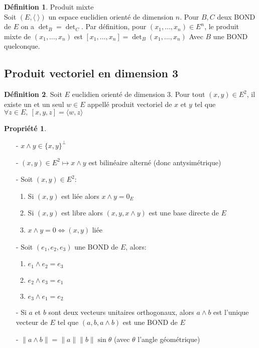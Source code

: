\documentclass[fleqn]{article}
\theoremstyle{definition} \newtheorem*{defi}{D\'efinition}
\theoremstyle{definition} \newtheorem*{theo}{Th\'eor\`eme}
\theoremstyle{definition} \newtheorem*{coro}{Corollaire}
\theoremstyle{remark} \newtheorem*{rqs}{Remarques}
\theoremstyle{definition} \newtheorem*{prop}{Propri\'et\'e}
\begin{document}
\begin{defi} Produit mixte \\
	Soit $(E, \langle\   \rangle)$ un espace euclidien orient\'e de dimension $n$. Pour $B,C$ deux BOND de $E$ on a $\det_B = \det_C$.
	Par d\'efinition, pour $(x_1, \hdots, x_n) \in E^n$, le produit mixte de $(x_1, \hdots, x_n)$ est $[x_1, \hdots, x_n] =
	\det_B (x_1, \hdots, x_n)$ Avec $B$ une BOND quelconque.
\end{defi}

\subsection{Produit vectoriel en dimension 3}

\begin{defi}
	Soit $E$ euclidien orient\'e de dimension 3. Pour tout $(x,y) \in E^2$, il existe un et un seul $w \in E$ appell\'e produit vectoriel de
	$x$ et $y$ tel que $\forall z \in E,\ [x,y,z] = \langle w,z \rangle$
\end{defi}

\begin{prop} $ $
	\begin{enumerate}
		\item [-] $x \wedge y \in \{x,y\}^\perp$
		\item [-] $(x,y) \in E^2 \mapsto x \wedge y$ est bilin\'eaire altern\'e (donc antysim\'etrique)
		\item [-] Soit $(x,y) \in E^2$:
			\begin{enumerate}
				\item Si $(x,y)$ est li\'ee alors $x \wedge y = 0_E$
				\item Si $(x,y)$ est libre alors $(x,y,x \wedge y)$ est une base directe de $E$
				\item $x \wedge y = 0 \Leftrightarrow (x,y)$ li\'ee
			\end{enumerate}
		\item [-] Soit $(e_1, e_2, e_3)$ une BOND de $E$, alors:
			\begin{enumerate}
				\item $e_1 \wedge e_2 = e_3$
				\item $e_2 \wedge e_3 = e_1$
				\item $e_3 \wedge e_1 = e_2$
			\end{enumerate}
		\item [-] Si $a$ et $b$ sont deux vecteurs unitaires orthogonaux, alors $a \wedge b$ est l'unique vecteur de $E$ tel que
			$(a,b,a \wedge b)$ est une BOND de $E$
		\item [-] $\| a \wedge b \| = \|a\| \|b\| \sin \theta$ (avec $\theta$ l'angle g\'eom\'etrique)
	\end{enumerate}
\end{prop}
\end{document}

